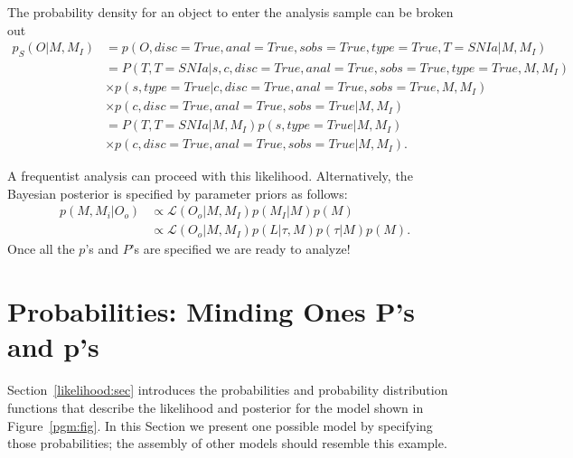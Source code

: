 \documentclass[preprint,3p]{elsarticle}
\begin{document}
The probability density for an object to enter the analysis sample can be broken out
\begin{align}
p_S(O|M, M_I) &= p(O, disc=True, anal=True, sobs=True, type=True, T=SNIa |M, M_I)\\
&= P(T, T=SNIa| s, c, disc=True, anal=True, sobs=True, type=True, M, M_I)\\
& \times  p(s, type=True | c, disc=True, anal=True, sobs=True, M, M_I)\\
& \times  p(c, disc=True, anal=True, sobs=True| M, M_I)\\
&= P(T, T=SNIa| M, M_I)  p(s, type=True | M, M_I) \\
& \times  p(c, disc=True, anal=True, sobs=True| M, M_I).
\end{align}


A frequentist analysis can proceed with this likelihood.
Alternatively, the Bayesian posterior is specified by parameter priors as follows:
\begin{align*}
p(M, M_i | O_o) & \propto \mathcal{L}(O_o| M, M_I) p(M_I|M) p(M)\\
 & \propto \mathcal{L}(O_o| M, M_I) p(L| \tau, M) p(\tau|M) p(M).
\end{align*}
Once all the $p$'s and $P$'s are specified we are ready to analyze!

\section{Probabilities: Minding Ones P's and p's}
Section~\ref{likelihood:sec} introduces the probabilities and probability distribution functions that describe the likelihood
and posterior for the model shown in Figure~\ref{pgm:fig}.
In this Section we present one possible model by specifying those probabilities; the assembly of other models should
resemble this example.
\end{document}
